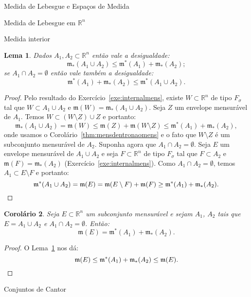 \documentclass[oneside,final,11pt]{amsbook}
\newcommand{\R}{\mathds R}
\newcommand{\leb}{\mathfrak m}
\theoremstyle{remark}\newtheorem{exercise}{Exercício}[chapter]
\theoremstyle{remark}\newtheorem{*exercise}[exercise]{\hbox to 0pt{\hskip 0pt minus 1fil*}Exercício}
\theoremstyle{definition}\newtheorem{exdefin}{Definição}[chapter]
\theoremstyle{plain}\newtheorem{teo}{Teorema}[section]
\theoremstyle{plain}\newtheorem{lem}[teo]{Lema}
\theoremstyle{plain}\newtheorem{prop}[teo]{Proposição}
\theoremstyle{plain}\newtheorem{cor}[teo]{Corolário}
\theoremstyle{definition}\newtheorem{defin}[teo]{Definição}
\theoremstyle{remark}\newtheorem{rem}[teo]{Observação}
\theoremstyle{definition}\newtheorem{notation}[teo]{Notação}
\theoremstyle{definition}\newtheorem{convention}[teo]{Convenção}
\theoremstyle{definition}\newtheorem{example}[teo]{Exemplo}
\numberwithin{section}{chapter}
\numberwithin{equation}{section}
\begin{document}
\begin{chapter}{Medida de Lebesgue e Espaços de Medida}
\begin{section}[Medida de Lebesgue em $\R^n$]{Medida de Lebesgue em ${\R^n}$}
\begin{subsection}{Medida interior}
\begin{lem}\label{thm:preintext}
Dados $A_1,A_2\subset\R^n$ então vale a desigualdade:
\[\leb_*(A_1\cup A_2)\le\leb^*(A_1)+\leb_*(A_2);\]
se $A_1\cap A_2=\emptyset$ então vale também a desigualdade:
\[\leb^*(A_1)+\leb_*(A_2)\le\leb^*(A_1\cup A_2).\]
\end{lem}
\begin{proof}
Pelo resultado do Exercício~\ref{exe:internalmens}, existe $W\subset\R^n$ de tipo $F_\sigma$ tal que
$W\subset A_1\cup A_2$ e $\leb(W)=\leb_*(A_1\cup A_2)$. Seja $Z$ um envelope mensurável de $A_1$. Temos
$W\subset(W\setminus Z)\cup Z$ e portanto:
\[\leb_*(A_1\cup A_2)=\leb(W)\le\leb(Z)+\leb(W\setminus Z)\le\leb^*(A_1)+\leb_*(A_2),\]
onde usamos o Corolário~\ref{thm:mensdentronaomens} e o fato que $W\setminus Z$ é um subconjunto mensurável
de $A_2$. Suponha agora que $A_1\cap A_2=\emptyset$. Seja $E$ um envelope mensurável de $A_1\cup A_2$
e seja $F\subset\R^n$ de tipo $F_\sigma$ tal que $F\subset A_2$ e $\leb(F)=\leb_*(A_2)$ (Exercício~\ref{exe:internalmens}).
Como $A_1\cap A_2=\emptyset$, temos $A_1\subset E\setminus F$ e portanto:
\[\leb^*(A_1\cup A_2)=\leb(E)=\leb(E\setminus F)+\leb(F)\ge\leb^*(A_1)+\leb_*(A_2).\qedhere\]
\end{proof}

\begin{cor}\label{thm:intext}
Seja $E\subset\R^n$ um subconjunto mensurável e sejam $A_1$, $A_2$ tais que $E=A_1\cup A_2$ e $A_1\cap A_2=\emptyset$. Então:
\[\leb(E)=\leb^*(A_1)+\leb_*(A_2).\]
\end{cor}
\begin{proof}
O Lema~\ref{thm:preintext} nos dá:
\[\leb(E)\le\leb^*(A_1)+\leb_*(A_2)\le\leb(E).\qedhere\]
\end{proof}

\end{subsection}

\end{section}

\begin{section}{Conjuntos de Cantor}
\label{sec:Cantor}


\end{section}
\end{chapter}
\end{document}
